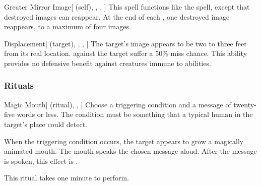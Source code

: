 \lowercase{\hypertarget{spell:Greater Mirror Image}{}}\label{spell:Greater Mirror Image}
\begin{attuneability}[\nth{4}]{\hypertarget{spell:Greater Mirror Image}{Greater Mirror Image}}[ (self), , , ]
This spell functions like the  spell, except that destroyed images can reappear.
At the end of each , one destroyed image reappears, to a maximum of four images.
\end{attuneability}
\vspace{0.25em}



\lowercase{\hypertarget{spell:Displacement}{}}\label{spell:Displacement}
\begin{attuneability}[\nth{6}]{\hypertarget{spell:Displacement}{Displacement}}[ (target), , , ]
The target's image appears to be two to three feet from its real location.
  against the target suffer a 50\% miss chance.
This ability provides no defensive benefit against creatures immune to  abilities.
\end{attuneability}
\vspace{0.25em}



\subsubsection{Rituals}


\lowercase{\hypertarget{spell:Magic Mouth}{}}\label{spell:Magic Mouth}
\begin{attuneability}[\nth{1}]{\hypertarget{spell:Magic Mouth}{Magic Mouth}}[ (ritual), , ]
Choose a triggering condition and a message of twenty-five words or less.
The condition must be something that a typical human in the target's place could detect.

When the triggering condition occurs, the target appears to grow a magically animated mouth.
The mouth speaks the chosen message aloud.
After the message is spoken, this effect is .

This ritual takes one minute to perform.
\end{attuneability}
\vspace{0.25em}


